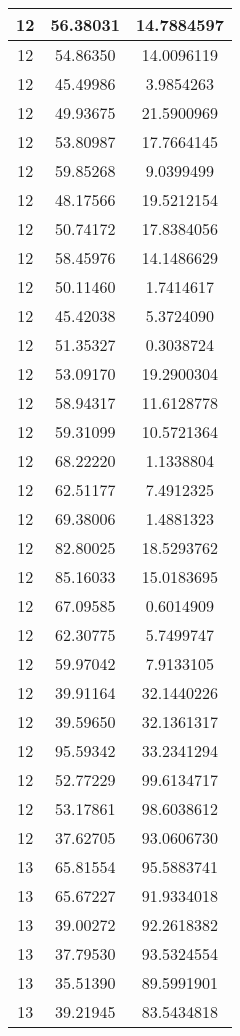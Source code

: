 \documentclass[
]{book}
\begin{document}
\begin{tabular}{c|c|c}
\hline
12 & 56.38031 & 14.7884597\\
\hline
12 & 54.86350 & 14.0096119\\
\hline
12 & 45.49986 & 3.9854263\\
\hline
12 & 49.93675 & 21.5900969\\
\hline
12 & 53.80987 & 17.7664145\\
\hline
12 & 59.85268 & 9.0399499\\
\hline
12 & 48.17566 & 19.5212154\\
\hline
12 & 50.74172 & 17.8384056\\
\hline
12 & 58.45976 & 14.1486629\\
\hline
12 & 50.11460 & 1.7414617\\
\hline
12 & 45.42038 & 5.3724090\\
\hline
12 & 51.35327 & 0.3038724\\
\hline
12 & 53.09170 & 19.2900304\\
\hline
12 & 58.94317 & 11.6128778\\
\hline
12 & 59.31099 & 10.5721364\\
\hline
12 & 68.22220 & 1.1338804\\
\hline
12 & 62.51177 & 7.4912325\\
\hline
12 & 69.38006 & 1.4881323\\
\hline
12 & 82.80025 & 18.5293762\\
\hline
12 & 85.16033 & 15.0183695\\
\hline
12 & 67.09585 & 0.6014909\\
\hline
12 & 62.30775 & 5.7499747\\
\hline
12 & 59.97042 & 7.9133105\\
\hline
12 & 39.91164 & 32.1440226\\
\hline
12 & 39.59650 & 32.1361317\\
\hline
12 & 95.59342 & 33.2341294\\
\hline
12 & 52.77229 & 99.6134717\\
\hline
12 & 53.17861 & 98.6038612\\
\hline
12 & 37.62705 & 93.0606730\\
\hline
13 & 65.81554 & 95.5883741\\
\hline
13 & 65.67227 & 91.9334018\\
\hline
13 & 39.00272 & 92.2618382\\
\hline
13 & 37.79530 & 93.5324554\\
\hline
13 & 35.51390 & 89.5991901\\
\hline
13 & 39.21945 & 83.5434818\\

\end{tabular}
\end{document}
